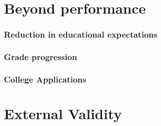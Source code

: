 \documentclass{beamer}
\begin{document}
\section{Beyond performance}

    \begin{frame}
            \label{frame:expectations}
            \frametitle{Reduction in educational expectations}
      {
    }   %
    \end{frame}

    \begin{frame}
            \label{frame:grade_progression}
            \frametitle{Grade progression}
    \end{frame}   

    \begin{frame}
            \label{frame:college_app}
            \frametitle{College Applications}
    \end{frame}      

\section{External Validity}
\end{document}
